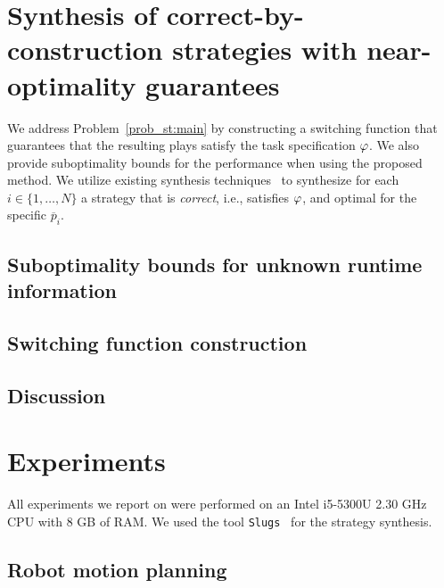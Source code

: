 


\section{Synthesis of correct-by-construction strategies with near-optimality guarantees}

We address Problem~\ref{prob_st:main} by constructing a switching function that guarantees that the resulting plays satisfy the task specification $\varphi$. We also provide suboptimality bounds for the performance when using the proposed method. We utilize existing synthesis techniques~\cite{Ehlerscost} to synthesize for each $i \in \{1,\ldots,N\}$ a strategy that is \emph{correct}, i.e., satisfies $\varphi$, and optimal for the specific $\overline{p}_i$.

\subsection{Suboptimality bounds for unknown runtime information}
\label{sec:generalization}


\subsection{Switching function construction}\label{sec:switching}


\subsection{Discussion}



\section{Experiments}
All experiments we report on were performed on an Intel i5-5300U 2.30 GHz CPU with 8 GB of RAM.  We used the tool \texttt{Slugs}~\cite{Ehlerslugs} for the strategy synthesis. 

\subsection{Robot motion planning}

